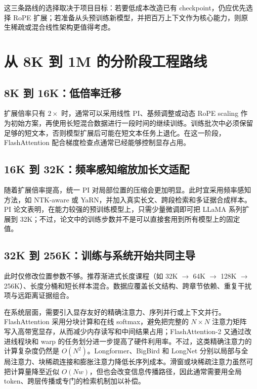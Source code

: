 \documentclass[UTF8,10pt,a4paper,fontset=none]{ctexart}
\begin{document}
这三条路线的选择取决于项目目标：若要低成本改造已有 checkpoint，仍应优先选择 RoPE 扩展；若准备从头预训练新模型，并把百万上下文作为核心能力，则原生稀疏或混合线性架构更值得考虑。

\section{从 8K 到 1M 的分阶段工程路线}
\subsection{8K 到 16K：低倍率迁移}
扩展倍率只有 $2\times$ 时，通常可以采用线性 PI、基频调整或动态 RoPE scaling 作为初始方案，再使用长短混合数据进行一段时间的继续训练。训练批次中必须保留足够的短文本，否则模型扩展后可能在短文本任务上退化。在这一阶段，FlashAttention 配合梯度检查点通常已经能够控制显存占用。

\subsection{16K 到 32K：频率感知缩放加长文适配}
随着扩展倍率提高，统一 PI 对局部位置的压缩会更加明显。此时宜采用频率感知方法，如 NTK-aware 或 YaRN，并加入真实长文、跨段检索和多证据合成样本。PI 论文表明，在能力较强的预训练模型上，只需少量微调即可把 LLaMA 系列扩展到 32K\cite{chen2023pi}；不过，论文中的训练步数并不是可以直接套用到所有模型上的固定值。

\subsection{32K 到 256K：训练与系统开始共同主导}
此时仅修改位置参数不够。推荐渐进式长度课程（如 32K $\rightarrow$ 64K $\rightarrow$ 128K $\rightarrow$ 256K）、长度分桶和短长样本混合。数据应覆盖长文结构、跨章节依赖、重复干扰项与远距离证据组合。

在系统层面，需要引入显存友好的精确注意力、序列并行或上下文并行。FlashAttention 采用分块计算和在线 softmax，避免把完整的 $N\times N$ 注意力矩阵写入高带宽显存，从而减少内存读写和中间结果占用\cite{dao2022flash}；FlashAttention-2 又通过改进线程块和 warp 的任务划分进一步提高了硬件利用率\cite{dao2023flash2}。不过，这类精确注意力的计算复杂度仍然是 $O(N^2)$。Longformer、BigBird 和 LongNet 分别以局部与全局注意力、块稀疏连接和膨胀注意力降低长序列成本\cite{beltagy2020longformer,zaheer2020bigbird,ding2023longnet}。滑窗或块稀疏注意力虽然可把计算量降至近似 $O(Nw)$，但也会改变信息传播路径，因此通常需要用全局 token、跨层传播或专门的检索机制加以补偿。
\end{document}
